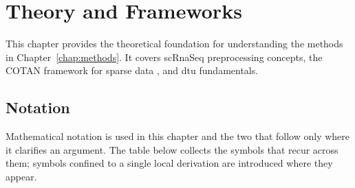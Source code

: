 \chapter{Theory and Frameworks}

This chapter provides the theoretical foundation for understanding the methods in Chapter~\ref{chap:methods}. It covers \gls{scRnaSeq} preprocessing concepts, the COTAN framework for sparse data \cite{galfre2021cotan}, and \gls{dtu} fundamentals.

\section*{Notation}

Mathematical notation is used in this chapter and the two that follow only where it clarifies an argument. The table below collects the symbols that recur across them; symbols confined to a single local derivation are introduced where they appear.


